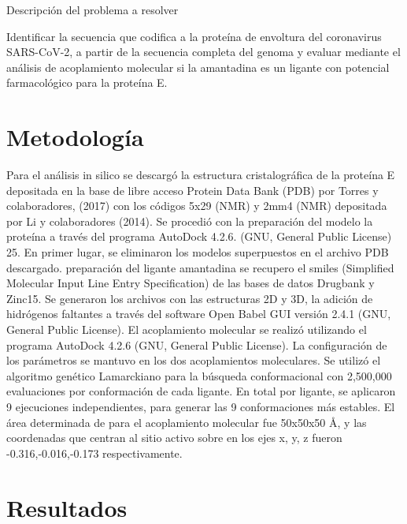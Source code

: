 \documentclass[12pt]{article}
\begin{document}
Descripción del problema a resolver

Identificar la secuencia que codifica a la proteína de envoltura del coronavirus SARS-CoV-2, a partir de la secuencia completa del genoma y evaluar mediante el análisis de acoplamiento molecular si la amantadina es un ligante con potencial farmacológico para la proteína E. 



\section{Metodología} 
Para el análisis in silico se descargó la estructura cristalográfica de la proteína E depositada en la base de libre acceso Protein Data Bank (PDB) por Torres y colaboradores, (2017) con los códigos 5x29 (NMR) y 2mm4 (NMR) depositada por Li y colaboradores (2014).  Se procedió con la preparación del modelo la proteína a través del programa AutoDock 4.2.6. (GNU, General Public License) 25. En primer lugar, se eliminaron los modelos superpuestos en el archivo PDB descargado. 
preparación del ligante amantadina se recupero el smiles (Simplified Molecular Input Line Entry Specification) de las bases de datos Drugbank y Zinc15. Se generaron los archivos con las estructuras 2D y 3D, la adición de hidrógenos faltantes a través del software Open Babel GUI versión 2.4.1 (GNU, General Public License).
El acoplamiento molecular se realizó utilizando el programa AutoDock 4.2.6 (GNU, General Public License). La configuración de los parámetros se mantuvo en los dos acoplamientos moleculares. Se utilizó el algoritmo genético Lamarckiano para la búsqueda conformacional con 2,500,000 evaluaciones por conformación de cada ligante. En total por ligante, se aplicaron 9 ejecuciones independientes, para generar las 9 conformaciones más estables. El área determinada de para el acoplamiento molecular fue 50x50x50 Å, y las coordenadas que centran al sitio activo sobre en los ejes x, y, z fueron -0.316,-0.016,-0.173 respectivamente.


\section{Resultados}
\end{document}
